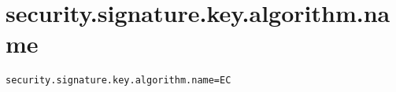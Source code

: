 \section{security.signature.key.algorithm.name}
\label{configuration:SecuritySignatureKeyAlgorithmName}
\AvailableInJavaOnly{\TODO}
\begin{lstlisting}[style=Props,caption={Usage example for \textit{security.signature.key.algorithm.name}}]
security.signature.key.algorithm.name=EC
\end{lstlisting}